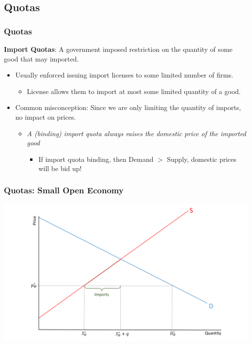 \documentclass{beamer}
\begin{document}
\subsection{Quotas}
\begin{frame}
	\frametitle{Quotas}
	\textbf{Import Quotas}: A government imposed restriction on the quantity of some good that may imported. 
	\begin{itemize}
		\item Usually enforced issuing import licenses to some limited number of firms.	
		\begin{itemize}
			\item License allows them to import at most some limited quantity of a good. 
		\end{itemize}
		\item Common misconception: Since we are only limiting the quantity of imports, no impact on prices.
		\begin{itemize}
			\item \emph{A (binding) import quota always raises the domestic price of the imported good}
			\begin{itemize}
				\item If import quota binding, then Demand $>$ Supply, domestic prices will be bid up!
			\end{itemize}
		\end{itemize}
	\end{itemize}
	
	
\end{frame}


\begin{frame}
	\frametitle{Quotas: Small Open Economy}
	
	\includegraphics[scale=0.3]{SL_16.pdf}

\end{frame}
\end{document}
